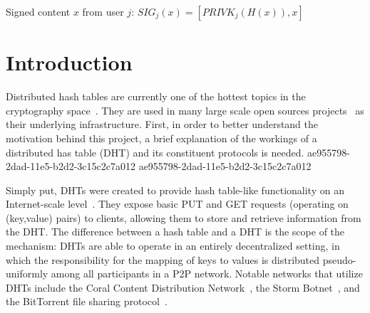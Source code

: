 \documentclass[12pt]{article}
\begin{document}
Signed content $x$ from user $j$: $SIG_j(x) = \left[ PRIVK_j( H(x) ), x \right]$

\section{Introduction}
\par Distributed hash tables are currently one of the hottest topics in the cryptography space~\cite{Stoica:2001dj,Rowstron:2001ea,Ratnasamy:2001wn}. They are used in many large scale open sources projects~\cite{Freitas:2013tb,Xu:2010vs,Perfitt:2010fh} as their underlying infrastructure. First, in order to better understand the motivation behind this project, a brief explanation of the workings of a distributed has table (DHT) and its constituent protocols is needed.
ae955798-2dad-11e5-b2d2-3c15c2c7a012
ae955798-2dad-11e5-b2d2-3c15c2c7a012\par Simply put, DHTs were created to provide hash table-like functionality on an Internet-scale level~\cite{Ratnasamy:2001wn}. They expose basic PUT and GET requests (operating on (key,value) pairs) to clients, allowing them to store and retrieve information from the DHT. The difference between a hash table and a DHT is the scope of the mechanism: DHTs are able to operate in an entirely decentralized setting, in which the responsibility for the mapping of keys to values is distributed pseudo-uniformly among all participants in a P2P network. Notable networks that utilize DHTs include the Coral Content Distribution Network~\cite{Freedman:2004vb}, the Storm Botnet~\cite{Holz:2008uk}, and the BitTorrent file sharing protocol~\cite{Cohen:y1_8mBnw}.
\end{document}
